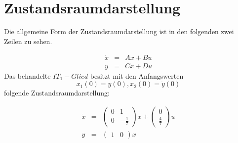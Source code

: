 \section{Zustandsraumdarstellung}

Die allgemeine Form der Zustandsraumdarstellung ist in den folgenden zwei Zeilen zu sehen.

\begin{eqnarray*}
	\dot x &=& Ax + Bu \\
	y &=& Cx + Du
\end{eqnarray*}
\noindent
Das behandelte $IT_1-Glied$ besitzt mit den Anfangswerten \[x_1(0) = y(0),  x_2(0) = \dot y(0)\] folgende Zustandsraumdarstellung:

\begin{eqnarray*}
	\dot x &=& \left(\begin{array}{cc} 0 & 1\\ 0 & -\frac{1}{7}\end{array}\right) x + \left(\begin{array}{c} 0\\ \frac{4}{7}\end{array}\right) u \\
	y &=& \left(\begin{array}{cc} 1 & 0\end{array}\right) x
\end{eqnarray*} 